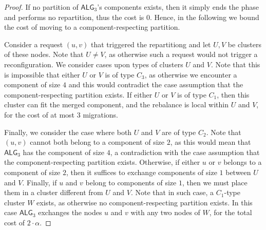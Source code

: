 \documentclass[manuscript,screen=true]{acmart}
\newcommand{\TAlg}{{\ensuremath{\textsf{ALG}_{3}}}\xspace} %
\begin{document}
\begin{proof}
  If no partition of \TAlg's components exists, then it simply ends the phase and performs no repartition, thus the cost is $0$.
  Hence, in the following we bound the cost of moving to a component-respecting partition.

  
    Consider a request $(u, v)$ that triggered the repartitiong and let $U, V$ be clusters of these nodes.
    Note that $U\neq V$, as otherwise such a request would not trigger a reconfiguration.
    We consider cases upon types of clusters $U$ and $V$.
    Note that this is impossible that either $U$ or $V$ is of type $C_3$, as otherwise we encounter a component of size $4$ and this would contradict the case assumption that the component-respecting partition exists.
    If either $U$ or $V$ is of type $C_1$, then this cluster can fit the merged component, and the rebalance is local within $U$ and $V$, for the cost of at most $3$ migrations.
  
    Finally, we consider the case where both $U$ and $V$ are of type $C_2$. Note that $(u,v)$ cannot both belong to a component of size $2$, as this would mean that \TAlg has the component of size $4$, a contradiction with the case assumption that the component-respecting partition exists. 
    Otherwise, if either $u$ or $v$ belongs to a component of size $2$, then it suffices to exchange components of size $1$ between $U$ and $V$.
    Finally, if $u$ and $v$ belong to components of size $1$, then we must place them in a cluster different from $U$ and $V$.
    Note that in such case, a $C_1$-type cluster $W$ exists, as otherwise no component-respecting partition exists. In this case \TAlg exchanges the nodes $u$ and $v$ with any two nodes of $W$, for the total cost of $2\cdot \alpha$.
\end{proof}
\end{document}
